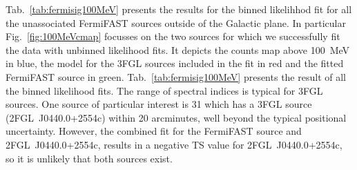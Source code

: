 \documentclass[useAMS,usenatbib]{mn2e}
\begin{document}
Tab.~\ref{tab:fermisig100MeV} presents the results for the binned
likelihhod fit for all the unassociated FermiFAST sources outside of
the Galactic plane.  In particular Fig.~\ref{fig:100MeVcmap} focusses
on the two sources for which we successfully fit the data with
unbinned likelihood fits.  It depicts the counts map above 100~MeV in
blue, the model for the 3FGL sources included in the fit in red and
the fitted FermiFAST source in green.  Tab.~\ref{tab:fermisig100MeV}
presents the result of all the binned likelihood fits.  The range of
spectral indices is typical for 3FGL sources. One source of particular
interest is 31 which has a 3FGL source (2FGL~J0440.0+2554c) within 20
arcminutes, well beyond the typical positional uncertainty.  However, the
combined fit for the FermiFAST source and 2FGL~J0440.0+2554c, results
in a negative TS value for 2FGL~J0440.0+2554c, so it is unlikely that both
sources exist.
\end{document}
